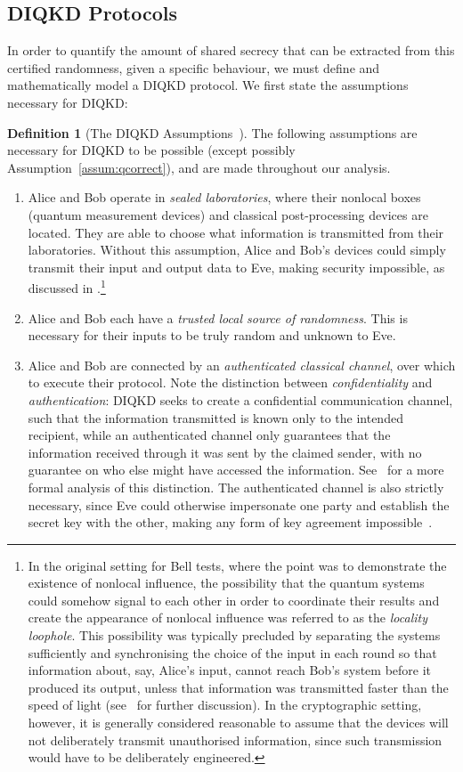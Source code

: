 \documentclass[10pt, a4paper]{article}
\numberwithin{equation}{section} %
\newcounter{stmt} %
\theoremstyle{definition}
\newtheorem{defn}[stmt]{Definition}
\theoremstyle{plain}
\newcommand{\?}{\mathrel{?}} %
\begin{document}
    \subsection{DIQKD Protocols}\label{sec:diqkd_proto}

    In order to quantify the amount of shared secrecy that can be extracted from this certified randomness, given a specific behaviour, we must define and mathematically model a DIQKD protocol. We first state the assumptions necessary for DIQKD\@:
    \begin{defn}[{The DIQKD Assumptions~\cite{DI_Proofs}}]\label{def:diqkdassump} The following assumptions are necessary for DIQKD to be possible (except possibly Assumption~\ref{assum:qcorrect}), and are made throughout our analysis.

      \begin{enumerate}
        \item Alice and Bob operate in \emph{sealed laboratories}, where their nonlocal boxes (quantum measurement devices) and classical post-processing devices are located. They are able to choose what information is transmitted from their laboratories. Without this assumption, Alice and Bob's devices could simply transmit their input and output data to Eve, making security impossible, as discussed in .\footnote{In the original setting for Bell tests, where the point was to demonstrate the existence of nonlocal influence, the possibility that the quantum systems could somehow signal to each other in order to coordinate their results and create the appearance of nonlocal influence was referred to as the \emph{locality loophole}. This possibility was typically precluded by separating the systems sufficiently and synchronising the choice of the input in each round so that information about, say, Alice's input, cannot reach Bob's system before it produced its output, unless that information was transmitted faster than the speed of light (see~\cite{BellNonlocality} for further discussion). In the cryptographic setting, however, it is generally considered reasonable to assume that the devices will not deliberately transmit unauthorised information, since such transmission would have to be deliberately engineered.}
        \item Alice and Bob each have a \emph{trusted local source of randomness}. This is necessary for their inputs to be truly random and unknown to Eve.
        \item Alice and Bob are connected by an \emph{authenticated classical channel}, over which to execute their protocol. Note the distinction between \emph{confidentiality} and \emph{authentication}: DIQKD seeks to create a confidential communication channel, such that the information transmitted is known only to the intended recipient, while an authenticated channel only guarantees that the information received through it was sent by the claimed sender, with no guarantee on who else might have accessed the information. See~\cite{SecurityQKD} for a more formal analysis of this distinction. The authenticated channel is also strictly necessary, since Eve could otherwise impersonate one party and establish the secret key with the other, making any form of key agreement impossible~\cite[Sec. 8.4.2]{BellNonlocality}.

\end{enumerate}
\end{defn}
\end{document}
